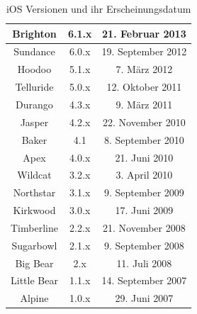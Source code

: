 \begin{table}[htbp]
{\begin{tabular}{|c|c|c|}
			Brighton                                 & 6.1.x                                   & 21. Februar 2013                                  \\ \hline
			Sundance                                 & 6.0.x                                   & 19. September 2012                                \\ \hline
			Hoodoo                                   & 5.1.x                                   & 7. März 2012                                      \\ \hline
			Telluride                                & 5.0.x                                   & 12. Oktober 2011                                  \\ \hline
			Durango                                  & 4.3.x                                   & 9. März 2011                                      \\ \hline
			Jasper                                   & 4.2.x                                   & 22. November 2010                                 \\ \hline
			Baker                                    & 4.1                                     & 8. September 2010                                 \\ \hline
			Apex                                     & 4.0.x                                   & 21. Juni 2010                                     \\ \hline
			Wildcat                                  & 3.2.x                                   & 3. April 2010                                     \\ \hline
			Northstar                                & 3.1.x                                   & 9. September 2009                                 \\ \hline
			Kirkwood                                 & 3.0.x                                   & 17. Juni 2009                                     \\ \hline
			Timberline                               & 2.2.x                                   & 21. November 2008                                 \\ \hline
			Sugarbowl                                & 2.1.x                                   & 9. September 2008                                 \\ \hline
			Big Bear                                 & 2.x                                     & 11. Juli 2008                                     \\ \hline
			Little Bear                              & 1.1.x                                   & 14. September 2007                                \\ \hline
			Alpine                                   & 1.0.x                                   & 29. Juni 2007                                     \\ \hline
		\end{tabular}
	}
\caption{iOS Versionen und ihr Erscheinungsdatum}\label{tab_ios_vers}\citep{ios_codenames}
\end{table}


